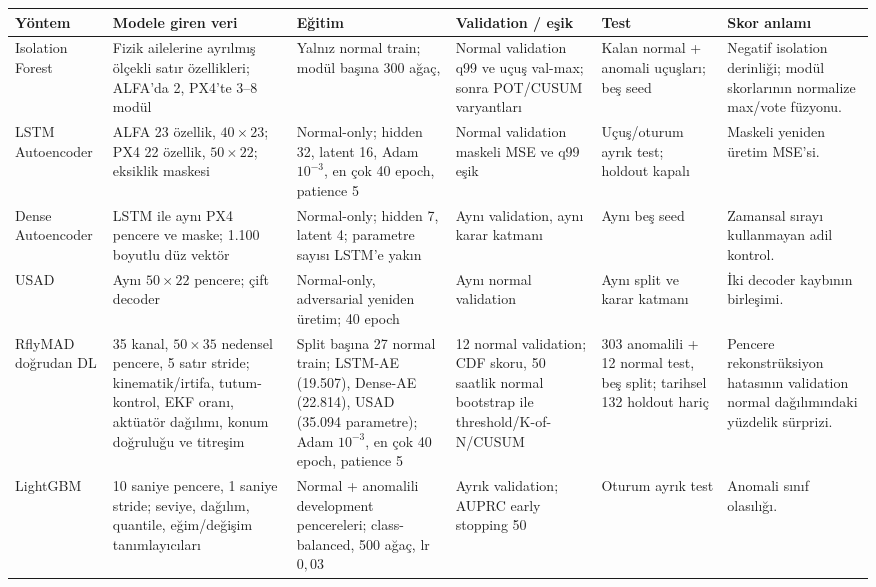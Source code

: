 \documentclass[10pt,a4paper]{article}
\newcommand{\code}[1]{\texttt{\detokenize{#1}}}
\begin{document}
\begin{landscape}
\scriptsize
\begin{longtable}{p{2.6cm}p{4.5cm}p{3.5cm}p{3.3cm}p{3.3cm}p{3.8cm}}
\toprule
\textbf{Yöntem} & \textbf{Modele giren veri} & \textbf{Eğitim} &
\textbf{Validation / eşik} & \textbf{Test} & \textbf{Skor anlamı} \\
\midrule
\endhead
Isolation Forest & Fizik ailelerine ayrılmış ölçekli satır özellikleri;
ALFA'da 2, PX4'te 3--8 modül & Yalnız normal train; modül başına 300 ağaç,
\code{max_samples=256} & Normal validation q99 ve uçuş val-max; sonra POT/CUSUM
varyantları & Kalan normal + anomali uçuşları; beş seed & Negatif isolation
derinliği; modül skorlarının normalize max/vote füzyonu. \\

LSTM Autoencoder & ALFA 23 özellik, $40\times23$; PX4 22 özellik,
$50\times22$; eksiklik maskesi & Normal-only; hidden 32, latent 16, Adam
$10^{-3}$, en çok 40 epoch, patience 5 & Normal validation maskeli MSE ve q99
eşik & Uçuş/oturum ayrık test; holdout kapalı & Maskeli yeniden üretim MSE'si. \\

Dense Autoencoder & LSTM ile aynı PX4 pencere ve maske; 1.100 boyutlu düz vektör &
Normal-only; hidden 7, latent 4; parametre sayısı LSTM'e yakın & Aynı validation,
aynı karar katmanı & Aynı beş seed & Zamansal sırayı kullanmayan adil kontrol. \\

USAD & Aynı $50\times22$ pencere; çift decoder & Normal-only, adversarial
yeniden üretim; 40 epoch & Aynı normal validation & Aynı split ve karar katmanı &
İki decoder kaybının birleşimi. \\

RflyMAD doğrudan DL & 35 kanal, $50\times35$ nedensel pencere, 5 satır stride;
kinematik/irtifa, tutum-kontrol, EKF oranı, aktüatör dağılımı, konum doğruluğu ve
titreşim & Split başına 27 normal train; LSTM-AE (19.507), Dense-AE (22.814),
USAD (35.094 parametre); Adam $10^{-3}$, en çok 40 epoch, patience 5 & 12 normal
validation; CDF skoru, 50 saatlik normal bootstrap ile threshold/K-of-N/CUSUM &
303 anomalili + 12 normal test, beş split; tarihsel 132 holdout hariç & Pencere
rekonstrüksiyon hatasının validation normal dağılımındaki yüzdelik sürprizi. \\

LightGBM & 10 saniye pencere, 1 saniye stride; seviye, dağılım, quantile,
eğim/değişim tanımlayıcıları & Normal + anomalili development pencereleri;
class-balanced, 500 ağaç, lr $0{,}03$ & Ayrık validation; AUPRC early stopping 50 &
Oturum ayrık test & Anomali sınıf olasılığı. \\


\end{longtable}
\end{landscape}
\end{document}
